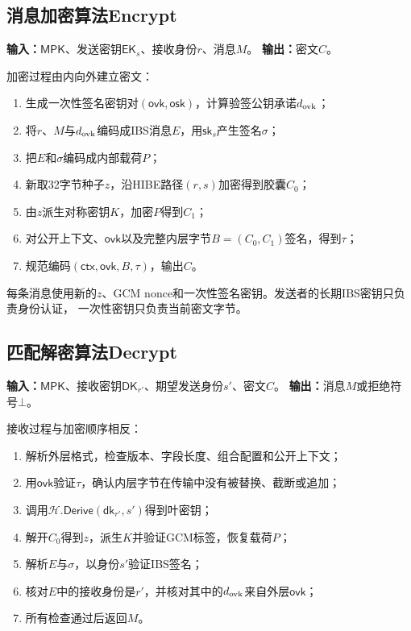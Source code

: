 \subsection{消息加密算法Encrypt}

\textbf{输入：}$\mathsf{MPK}$、发送密钥$\mathsf{EK}_s$、接收身份$r$、消息$M$。\quad
\textbf{输出：}密文$C$。

加密过程由内向外建立密文：
\begin{enumerate}
  \item 生成一次性签名密钥对$(\mathsf{ovk},\mathsf{osk})$，计算验签公钥承诺$d_{\rm ovk}$；
  \item 将$r$、$M$与$d_{\rm ovk}$编码成IBS消息$E$，用$\mathsf{sk}_s$产生签名$\sigma$；
  \item 把$E$和$\sigma$编码成内部载荷$P$；
  \item 新取32字节种子$z$，沿HIBE路径$(r,s)$加密得到胶囊$C_0$；
  \item 由$z$派生对称密钥$K$，加密$P$得到$C_1$；
  \item 对公开上下文、$\mathsf{ovk}$以及完整内层字节$B=(C_0,C_1)$签名，得到$\tau$；
  \item 规范编码$(\mathsf{ctx},\mathsf{ovk},B,\tau)$，输出$C$。
\end{enumerate}

每条消息使用新的$z$、GCM nonce和一次性签名密钥。发送者的长期IBS密钥只负责身份认证，
一次性密钥只负责当前密文字节。

\subsection{匹配解密算法Decrypt}

\textbf{输入：}$\mathsf{MPK}$、接收密钥$\mathsf{DK}_{r'}$、期望发送身份$s'$、密文$C$。\quad
\textbf{输出：}消息$M$或拒绝符号$\bot$。

接收过程与加密顺序相反：
\begin{enumerate}
  \item 解析外层格式，检查版本、字段长度、组合配置和公开上下文；
  \item 用$\mathsf{ovk}$验证$\tau$，确认内层字节在传输中没有被替换、截断或追加；
  \item 调用$\mathcal H.\mathsf{Derive}(\mathsf{dk}_{r'},s')$得到叶密钥；
  \item 解开$C_0$得到$z$，派生$K$并验证GCM标签，恢复载荷$P$；
  \item 解析$E$与$\sigma$，以身份$s'$验证IBS签名；
  \item 核对$E$中的接收身份是$r'$，并核对其中的$d_{\rm ovk}$来自外层$\mathsf{ovk}$；
  \item 所有检查通过后返回$M$。
\end{enumerate}

